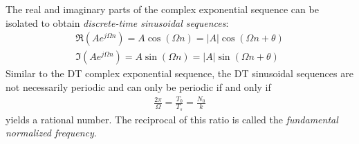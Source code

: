 \documentclass{report}
\begin{document}
\\ \\
The real and imaginary parts of the complex exponential sequence can be isolated to obtain \emph{discrete-time sinusoidal sequences}:
\begin{align}
    \Re(Ae^{j\Omega n}) = A \cos(\Omega n) = |A| \cos(\Omega n + \theta) \\
    \Im(Ae^{j\Omega n}) = A \sin(\Omega n) = |A| \sin(\Omega n + \theta)
\end{align}
Similar to the DT complex exponential sequence, the DT sinusoidal sequences are not necessarily periodic and can only be periodic if and only if
\begin{align}
    \frac{2\pi}{\Omega} = \frac{T_0}{T_s} = \frac{N_0}{k}
\end{align}
yields a rational number. The reciprocal of this ratio is called the \emph{fundamental normalized frequency}.
\end{document}
